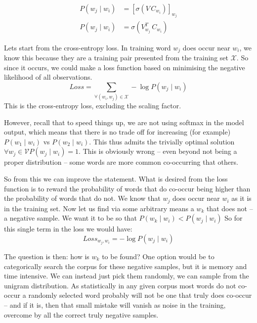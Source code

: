 \documentclass[parskip]{komatufte}
\begin{document}
\begin{align}
P(w_j \mid w_{i}) & = \left[\sigma(V\,C_{w_{i}}) \right]_{w_j} \\
P(w_j \mid w_{i}) & = \sigma(V_{w_j}^T\,C_{w_{i}})
\end{align}



Lets start from the cross-entropy loss.
In training word $w_j$ does occur near $w_i$, we know this because they are a training pair presented from the training set $\mathcal{X}$.
So since it occurs, we could make a loss function based on minimising the negative likelihood of all observations.
\begin{equation}
Loss = \sum_{\forall (w_i,w_j)\in \mathcal{X}} -\log P(w_j\mid w_i)
\end{equation}
This is the cross-entropy loss, excluding the scaling factor.

However, recall that to speed things up, we are not using softmax in the model output,
which means that there is no trade off for increasing (for example) $P(w_1\mid w_i)$ vs $P(w_2\mid w_i)$.
This thus admits the trivially optimal solution $\forall w_j\in \mathcal{V} P(w_j \mid w_i) = 1$.
This is obviously wrong -- even beyond not being a proper distribution -- some words are more common co-occurring that others.

So from this we can improve the statement.
What is desired from the loss function is to reward the probability of words that do co-occur being higher than the probability of words that do not.
We know that $w_j$ does occur near $w_i$ as it is in the training set.
Now let us find via some arbitrary means a $w_k$ that does not -- a negative sample.
We want it to be so that $P(w_k\mid w_i) < P(w_j\mid w_i)$
So for this single term in the loss we would have:
\begin{equation}
Loss_{w_j,w_i} =   - \log P(w_j\mid w_i)
\end{equation}



The question is then: how is $w_k$ to be found?
One option would be to categorically search the corpus for these negative samples,
but it is memory and time intensive.
We can instead just pick them randomly,
we can sample from the unigram distribution.
As statistically in any given corpus most words do not co-occur 
a randomly selected word probably will not be one that truly does co-occur
-- and if it is, then that small mistake will vanish as noise in the training,
overcome by all the correct truly negative samples.
\end{document}

